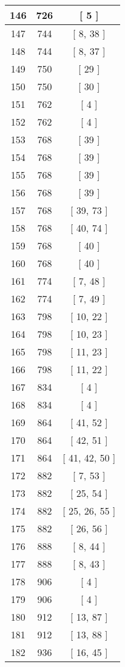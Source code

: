 \begin{center}
\begin{longtable}[H]{|| c c c ||}
146 & 726 & [ 5 ] \\ 
\hline
147 & 744 & [ 8, 38 ] \\ 
\hline
148 & 744 & [ 8, 37 ] \\ 
\hline
149 & 750 & [ 29 ] \\ 
\hline
150 & 750 & [ 30 ] \\ 
\hline
151 & 762 & [ 4 ] \\ 
\hline
152 & 762 & [ 4 ] \\ 
\hline
153 & 768 & [ 39 ] \\ 
\hline
154 & 768 & [ 39 ] \\ 
\hline
155 & 768 & [ 39 ] \\ 
\hline
156 & 768 & [ 39 ] \\ 
\hline
157 & 768 & [ 39, 73 ] \\ 
\hline
158 & 768 & [ 40, 74 ] \\ 
\hline
159 & 768 & [ 40 ] \\ 
\hline
160 & 768 & [ 40 ] \\ 
\hline
161 & 774 & [ 7, 48 ] \\ 
\hline
162 & 774 & [ 7, 49 ] \\ 
\hline
163 & 798 & [ 10, 22 ] \\ 
\hline
164 & 798 & [ 10, 23 ] \\ 
\hline
165 & 798 & [ 11, 23 ] \\ 
\hline
166 & 798 & [ 11, 22 ] \\ 
\hline
167 & 834 & [ 4 ] \\ 
\hline
168 & 834 & [ 4 ] \\ 
\hline
169 & 864 & [ 41, 52 ] \\ 
\hline
170 & 864 & [ 42, 51 ] \\ 
\hline
171 & 864 & [ 41, 42, 50 ] \\ 
\hline
172 & 882 & [ 7, 53 ] \\ 
\hline
173 & 882 & [ 25, 54 ] \\ 
\hline
174 & 882 & [ 25, 26, 55 ] \\ 
\hline
175 & 882 & [ 26, 56 ] \\ 
\hline
176 & 888 & [ 8, 44 ] \\ 
\hline
177 & 888 & [ 8, 43 ] \\ 
\hline
178 & 906 & [ 4 ] \\ 
\hline
179 & 906 & [ 4 ] \\ 
\hline
180 & 912 & [ 13, 87 ] \\ 
\hline
181 & 912 & [ 13, 88 ] \\ 
\hline
182 & 936 & [ 16, 45 ] \\ 

\end{longtable}
\end{center}
